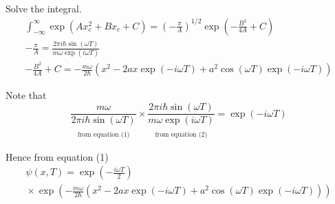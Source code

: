 \documentclass[12pt]{article}
\begin{document}
Solve the integral.
\begin{gather*}
\int_{-\infty}^\infty\exp(Ax_c^2+Bx_c+C)
=\left(-\frac{\pi}{A}\right)^{1/2}
\exp\left(-\frac{B^2}{4A}+C\right)
\\
-\frac{\pi}{A}
=\frac{2\pi i\hbar\sin(\omega T)}{m\omega\exp(i\omega T)}
\tag{2}
\\
-\frac{B^2}{4A}+C
=-\frac{m\omega}{2\hbar}
\left(x^2-2ax\exp(-i\omega T)+a^2\cos(\omega T)\exp(-i\omega T)\right)
\tag{3}
\end{gather*}

Note that
\begin{equation*}
\underset{\substack{\\[1ex]\text{from equation (1)}}}
{\frac{m\omega}{2\pi i\hbar\sin(\omega T)}}
\times
\underset{\substack{\\[1ex]\text{from equation (2)}}}
{\frac{2\pi i\hbar\sin(\omega T)}{m\omega\exp(i\omega T)}}
=\exp(-i\omega T)
\tag{4}
\end{equation*}

Hence from equation (1)
\begin{multline*}
\psi(x,T)=\exp\left(-\frac{i\omega T}{2}\right)
\\
{}\times\exp\left(
-\frac{m\omega}{2\hbar}
\left(x^2-2ax\exp(-i\omega T)+a^2\cos(\omega T)\exp(-i\omega T)\right)
\right)
\end{multline*}
\end{document}

